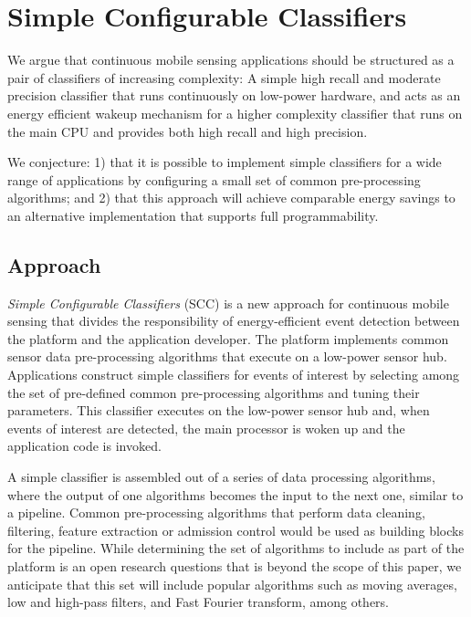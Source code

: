 \section{Simple Configurable Classifiers}
\label{sec:conjecture}

We argue that continuous mobile sensing applications should be
structured as a pair of classifiers of increasing complexity: A simple
high recall and moderate precision classifier that runs continuously
on low-power hardware, and acts as an energy efficient wakeup
mechanism for a higher complexity classifier that runs on the main CPU
and provides both high recall and high precision.

We conjecture: 1) that it is possible to implement simple classifiers for a 
wide range of applications by configuring a small set of common pre-processing 
algorithms; and  2) that this approach will achieve comparable energy 
savings to an alternative implementation that supports full programmability.

\subsection {Approach}

{\em Simple Configurable Classifiers} (SCC) is a new approach for
continuous mobile sensing that divides the responsibility of
energy-efficient event detection between the platform and
the application developer.  The platform implements common sensor data
pre-processing algorithms that execute on a low-power sensor hub.
Applications construct simple classifiers for events of interest by
selecting among the set of pre-defined common pre-processing
algorithms and tuning their parameters.  This classifier executes on
the low-power sensor hub and, when events of interest are detected,
the main processor is woken up and the application code is invoked.
  
A simple classifier is assembled out of a series of data processing
algorithms, where the output of one algorithms becomes the input to
the next one, similar to a pipeline.  Common pre-processing algorithms
that perform data cleaning, filtering, feature extraction or admission
control would be used as building blocks for the pipeline.  While
determining the set of algorithms to include as part of the platform
is an open research questions that is beyond the scope of this paper,
we anticipate that this set will include popular algorithms such as
moving averages, low and high-pass filters, and Fast Fourier
transform, among others.

